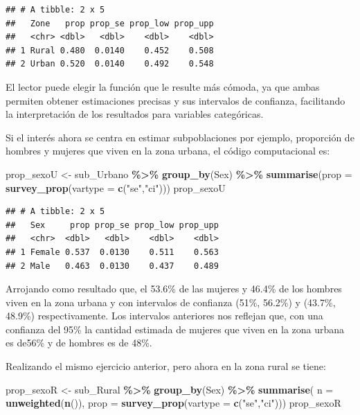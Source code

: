 \documentclass[
  12pt,
]{book}
\newenvironment{Shaded}{\begin{snugshade}}{\end{snugshade}}
\newcommand{\AttributeTok}[1]{\textcolor[rgb]{0.13,0.29,0.53}{#1}}
\newcommand{\FunctionTok}[1]{\textcolor[rgb]{0.13,0.29,0.53}{\textbf{#1}}}
\newcommand{\NormalTok}[1]{#1}
\newcommand{\OtherTok}[1]{\textcolor[rgb]{0.56,0.35,0.01}{#1}}
\newcommand{\SpecialCharTok}[1]{\textcolor[rgb]{0.81,0.36,0.00}{\textbf{#1}}}
\newcommand{\StringTok}[1]{\textcolor[rgb]{0.31,0.60,0.02}{#1}}
\begin{document}
\begin{verbatim}
## # A tibble: 2 x 5
##   Zone   prop prop_se prop_low prop_upp
##   <chr> <dbl>   <dbl>    <dbl>    <dbl>
## 1 Rural 0.480  0.0140    0.452    0.508
## 2 Urban 0.520  0.0140    0.492    0.548
\end{verbatim}

El lector puede elegir la función que le resulte más cómoda, ya que ambas permiten obtener estimaciones precisas y sus intervalos de confianza, facilitando la interpretación de los resultados para variables categóricas.

Si el interés ahora se centra en estimar subpoblaciones por ejemplo, proporción de hombres y mujeres que viven en la zona urbana, el código computacional es:

\begin{Shaded}
\begin{Highlighting}[]
\NormalTok{prop\_sexoU }\OtherTok{\textless{}{-}}\NormalTok{ sub\_Urbano }\SpecialCharTok{\%\textgreater{}\%} \FunctionTok{group\_by}\NormalTok{(Sex) }\SpecialCharTok{\%\textgreater{}\%} 
              \FunctionTok{summarise}\NormalTok{(}\AttributeTok{prop =} \FunctionTok{survey\_prop}\NormalTok{(}\AttributeTok{vartype =} \FunctionTok{c}\NormalTok{(}\StringTok{"se"}\NormalTok{,}\StringTok{"ci"}\NormalTok{)))}
\NormalTok{prop\_sexoU}
\end{Highlighting}
\end{Shaded}

\begin{verbatim}
## # A tibble: 2 x 5
##   Sex     prop prop_se prop_low prop_upp
##   <chr>  <dbl>   <dbl>    <dbl>    <dbl>
## 1 Female 0.537  0.0130    0.511    0.563
## 2 Male   0.463  0.0130    0.437    0.489
\end{verbatim}

Arrojando como resultado que, el 53.6\% de las mujeres y 46.4\% de los hombres viven en la zona urbana y con intervalos de confianza (51\%, 56.2\%) y (43.7\%, 48.9\%) respectivamente. Los intervalos anteriores nos reflejan que, con una confianza del 95\% la cantidad estimada de mujeres que viven en la zona urbana es de56\% y de hombres es de 48\%.

Realizando el mismo ejercicio anterior, pero ahora en la zona rural se tiene:

\begin{Shaded}
\begin{Highlighting}[]
\NormalTok{prop\_sexoR }\OtherTok{\textless{}{-}}\NormalTok{ sub\_Rural }\SpecialCharTok{\%\textgreater{}\%} \FunctionTok{group\_by}\NormalTok{(Sex) }\SpecialCharTok{\%\textgreater{}\%} 
              \FunctionTok{summarise}\NormalTok{( }\AttributeTok{n =} \FunctionTok{unweighted}\NormalTok{(}\FunctionTok{n}\NormalTok{()),}
                         \AttributeTok{prop =} \FunctionTok{survey\_prop}\NormalTok{(}\AttributeTok{vartype =} \FunctionTok{c}\NormalTok{(}\StringTok{"se"}\NormalTok{,}\StringTok{"ci"}\NormalTok{)))}
\NormalTok{prop\_sexoR}
\end{Highlighting}
\end{Shaded}
\end{document}
